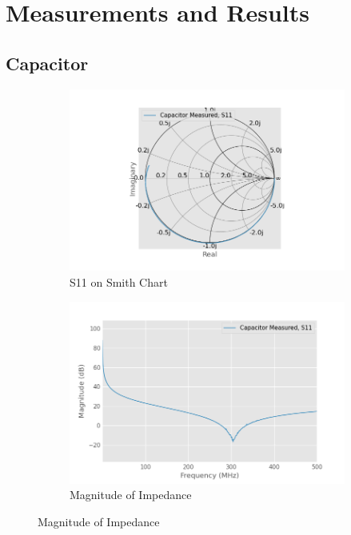 \documentclass{article}
\begin{document}
\section{Measurements and Results}

\subsection{Capacitor}
\begin{figure}[h]
    \centering
    \begin{subfigure}{0.5\linewidth}
        \includegraphics[width=.9\linewidth]{./pics/capacitor_meas_smith.png}
        \caption{S11 on Smith Chart}
    \end{subfigure}%
    \begin{subfigure}{0.5\linewidth}
        \includegraphics[width=.9\linewidth]{./pics/capacitor_meas_db.png}
        \caption{Magnitude of Impedance}
    \end{subfigure}


\end{figure}
\end{document}

